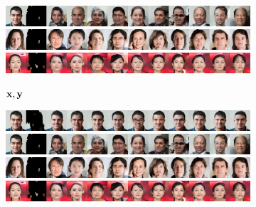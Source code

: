 \begin{figure}[t]
\begin{subfigure}[t]{0.14\textwidth}
    \includegraphics[trim=0px 0px 2560px 0px, clip, height=\cmgfailureimgheight]{figs/cigcvae/co_mod_gan_failure/aipo_0_4_2.jpg}
    \includegraphics[trim=0px 0px 2560px 0px, clip, height=\cmgfailureimgheight]{figs/cigcvae/co_mod_gan_failure/aipo_1_4_2.jpg}
    \includegraphics[trim=0px 0px 2560px 0px, clip, height=\cmgfailureimgheight]{figs/cigcvae/co_mod_gan_failure/aipo_56_4_12.jpg}
    \caption{$\mathbf{x}, \mathbf{y}$}
  \end{subfigure}
  \begin{subfigure}[t]{0.73\textwidth}
    \centering
    \includegraphics[trim=512px 0px 0px 0px, clip, height=\cmgfailureimgheight]{figs/cigcvae/co_mod_gan_failure/aipo_0_3_2.jpg}
    \includegraphics[trim=512px 0px 0px 0px, clip, height=\cmgfailureimgheight]{figs/cigcvae/co_mod_gan_failure/aipo_0_4_2.jpg}
    \includegraphics[trim=512px 0px 0px 0px, clip, height=\cmgfailureimgheight]{figs/cigcvae/co_mod_gan_failure/aipo_1_4_2.jpg}
    \includegraphics[trim=512px 0px 0px 0px, clip, height=\cmgfailureimgheight]{figs/cigcvae/co_mod_gan_failure/aipo_56_4_12.jpg}

\end{subfigure}
\end{figure}

